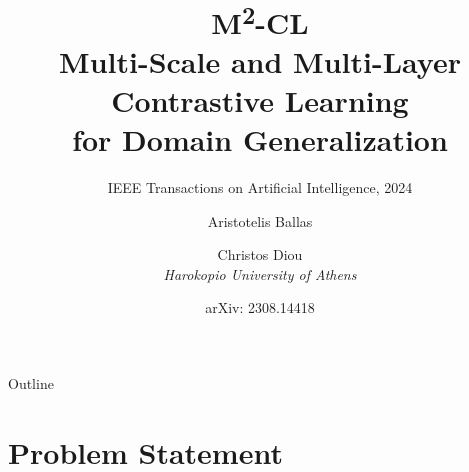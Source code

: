 \documentclass[aspectratio=169,10pt]{beamer}
\title[M\textsuperscript{2}-CL]{%
  \textbf{M\textsuperscript{2}-CL}\\[4pt]
  Multi-Scale and Multi-Layer Contrastive Learning\\
  for Domain Generalization}
\subtitle{IEEE Transactions on Artificial Intelligence, 2024}
\author[Ballas \& Diou]{%
  Aristotelis Ballas \and Christos Diou\\[6pt]
  {\small \textit{Harokopio University of Athens}}}
\date{arXiv: 2308.14418}
\institute{}
\begin{document}

\begin{frame}[plain]
  \titlepage
\end{frame}

\begin{frame}{Outline}
  \tableofcontents[hideallsubsections]
\end{frame}

\section{Problem Statement}
\end{document}

